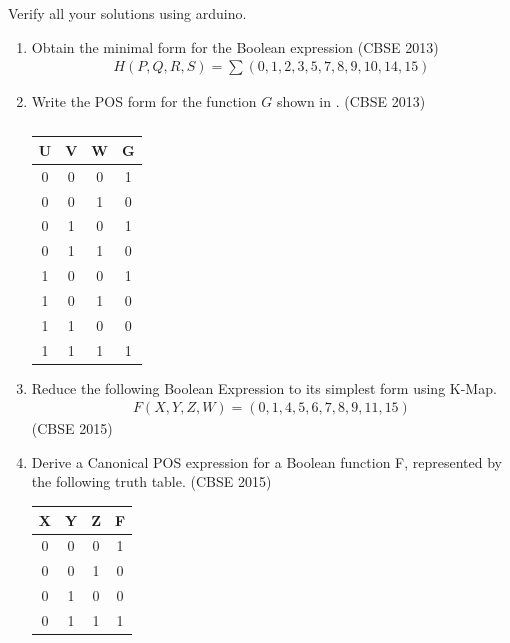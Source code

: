 Verify all your solutions using arduino.
\begin{enumerate}[label=\arabic*.,ref=\theenumi]
	\item 		Obtain the minimal form for the Boolean expression
\hfill (CBSE 2013)
\label{prob:2013/d/6/d}
		\begin{align*}
H(P,Q,R,S)=\sum(0,1,2,3,5,7,8,9,10,14,15)
		\end{align*}
	\item Write the POS form for the function $G$ shown in 
.
\hfill (CBSE 2013)
\label{prob:2013/c/6/d}
		\begin{table}[H]
			\centering
		\begin{tabular}{ |c |c |c |c |}
 \hline
 U  &  V  &  W  &  G\\
 \hline
 0  &  0  &  0  &  1\\
 \hline
 0  &  0  &  1  &  0\\
 \hline
 0  &  1  &  0  &  1\\
 \hline
 0  &  1  &  1  &  0\\
 \hline
 1  &  0  &  0  &  1\\
 \hline
 1  &  0  &  1  &  0\\
 \hline
 1  &  1  &  0  &  0\\
 \hline
 1  &  1  &  1  &  1\\
 \hline
 \end{tabular}
			\caption{}
\label{tab:2013/c/6/d}
 \end{table}
	\item Reduce the following Boolean Expression to its simplest form using K-Map.
\label{prob:2015-1/c/6/d}
		\begin{align*}
			F(X,Y,Z,W)=(0,1,4,5,6,7,8,9,11,15)
		\end{align*}
\hfill (CBSE 2015)
		\iffalse
	\item 
		Derive a Canonical POS expression for a Boolean function F, represented by the following truth table. 
\label{prob:2015-1/c/6/c}
\hfill (CBSE 2015)
		\begin{table}[H]
			\centering
		\begin{tabular}{|c|c|c|c|}
	\hline
X & Y & Z & F \\
\hline
0 & 0 & 0 & 1 \\  
\hline
0 & 0 & 1 & 0 \\ 
\hline
0 & 1 & 0 & 0 \\
\hline
0 & 1 & 1 & 1 \\

\end{tabular}
\end{table}
\end{enumerate}
